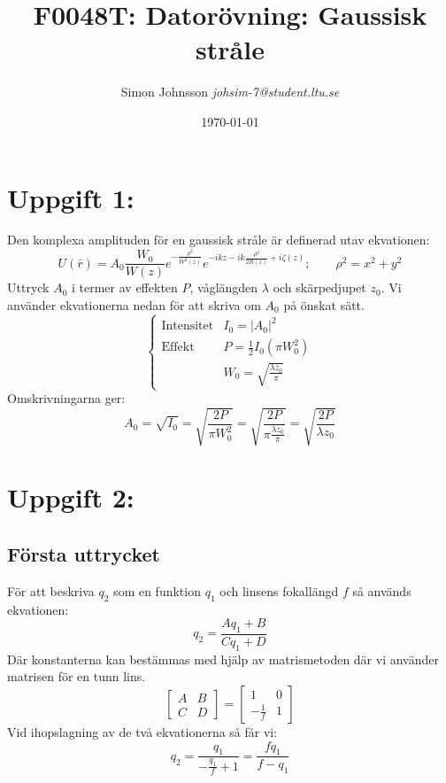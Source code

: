 \documentclass{article}
\begin{document}
  \title{F0048T: Datorövning: Gaussisk stråle}
  \author{Simon Johnsson \textit{johsim-7@student.ltu.se}}
  \date{\today}
  \maketitle

\section*{Uppgift 1:}
  Den komplexa amplituden för en gaussisk stråle är definerad utav ekvationen:
  \[
    U(\bar{r})=A_0\frac{W_0}{W(z)}e^{-\frac{\rho^2}{W^2(z)}}e^{-ikz-ik\frac{\rho^2}{2R(z)}+i\zeta(z)};\qquad\rho^2=x^2+y^2
  \]
  Uttryck $A_0$ i termer av effekten $P$, våglängden $\lambda$ och skärpedjupet $z_0$. Vi använder ekvationerna nedan för att skriva om $A_0$ på önskat sätt.
  \[
    \begin{cases}
      \text{Intensitet}&I_0=|A_0|^2\\
      \text{Effekt}&P=\frac{1}{2}I_0(\pi W_0^2)\\
      &W_0=\sqrt{\frac{\lambda z_0}{\pi}}
    \end{cases}
  \]
  Omskrivningarna ger:
  \[
    A_0=\sqrt{I_0}=\sqrt{\frac{2P}{\pi W_0^2}}=\sqrt{\frac{2P}{\pi \frac{\lambda z_0}{\pi}}}=\sqrt{\frac{2P}{\lambda z_0}}
  \]

\newpage
\section*{Uppgift 2:}
  \subsection*{Första uttrycket}
    För att beskriva $q_2$ som en funktion $q_1$ och linsens fokallängd $f$ så används ekvationen:
    \[
      q_2=\frac{Aq_1+B}{Cq_1+D}
    \]
    Där konstanterna kan bestämmas med hjälp av matrismetoden där vi använder matrisen för en tunn lins.
    \[
      \begin{bmatrix}
        A&B\\
        C&D
      \end{bmatrix}
      =
      \begin{bmatrix}
        1&0\\
        -\frac{1}{f}&1
      \end{bmatrix}
    \]
    Vid ihopslagning av de två ekvationerna så får vi:
    \[
      q_2=\frac{q_1}{-\frac{q_1}{f}+1}=\frac{fq_1}{f-q_1}
    \]
\end{document}
